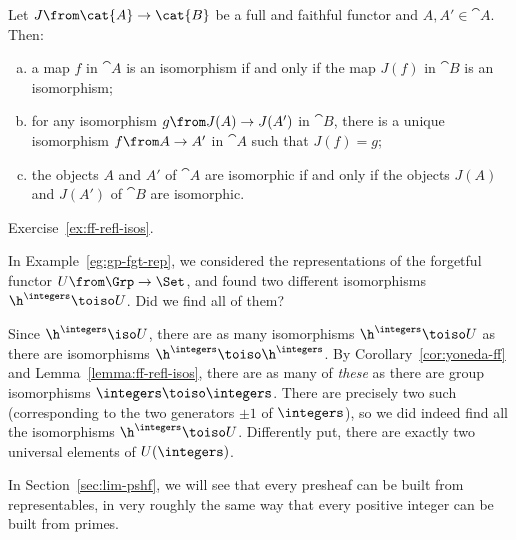 \begin{lemma}   
\label{lemma:ff-refl-isos}
% 
%
%
Let $J\from \cat{A} \to \cat{B}$ be a full and faithful functor and $A, A' \in
\cat{A}$.  Then: 
% 
\begin{enumerate}[(b)]
\item 
a map $f$ in $\cat{A}$ is an isomorphism if and only if the map $J(f)$ in
$\cat{B}$ is an isomorphism;

\item 
\label{lemma:ff-refl-isos:medium} 
for any isomorphism $g\from J(A) \to J(A')$ in $\cat{B}$, there is a unique
isomorphism $f\from A \to A'$ in $\cat{A}$ such that $J(f) = g$;

\item   
\label{lemma:ff-refl-isos:weakest} 
the objects $A$ and $A'$ of $\cat{A}$ are isomorphic if and only if the
objects $J(A)$ and $J(A')$ of $\cat{B}$ are isomorphic.
\end{enumerate}
\end{lemma}

\begin{pf}
Exercise~\ref{ex:ff-refl-isos}.
\end{pf}

\begin{example}
In Example~\ref{eg:gp-fgt-rep}, we considered the representations of the
forgetful functor $U\from \Grp \to \Set$,%
%
%
and found two different isomorphisms\linebreak $\h^\integers \toiso U$.%
%
%
Did we find all of them?

Since $\h^\integers \iso U$, there are as many isomorphisms $\h^\integers
\toiso U$ as there are isomorphisms $\h^\integers \toiso \h^\integers$.  By
Corollary~\ref{cor:yoneda-ff} and
Lemma~\ref{lemma:ff-refl-isos}, there are
as many of \emph{these} as there are group isomorphisms $\integers \toiso
\integers$.  There are precisely two such (corresponding to the two
generators $\pm 1$ of $\integers$), so we did indeed find all the
isomorphisms $\h^\integers \toiso U$.  Differently put, there are exactly
two universal elements of $U(\integers)$.
\end{example}

In Section~\ref{sec:lim-pshf}, we will see that every presheaf can be built
from representables, in very roughly the same way that every positive
integer can be built from primes.%
%
%



